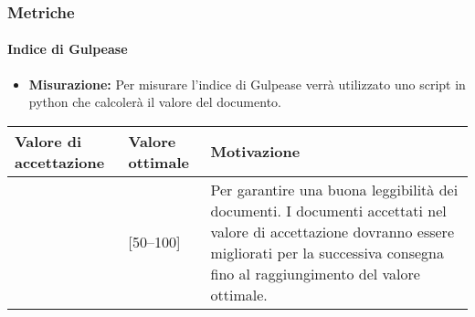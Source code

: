 \subsubsection{Metriche}

\paragraph{Indice di Gulpease}

\begin{itemize}
\item \textbf{Misurazione:} Per misurare l'indice di Gulpease verrà utilizzato uno script in python che calcolerà il valore del documento.
\end{itemize}

\begin{center}

		\begin{tabular}{|P{2.5cm}|P{2.5cm}|P{6cm}|}
		\hline
			\textbf{Valore di accettazione}	& \textbf{Valore ottimale} & \textbf{Motivazione} \\
			\hline
			[40 -- 100] & [50--100] &	Per garantire una buona leggibilità dei documenti. I documenti accettati nel valore di accettazione dovranno essere migliorati per la successiva consegna fino al raggiungimento del valore ottimale. \\
			\hline
			\end{tabular}
\end{center}